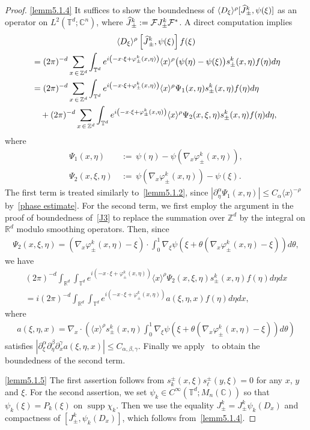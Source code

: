 \documentclass[10pt]{amsart}
\theoremstyle{definition}
\numberwithin{equation}{section}
\renewcommand{\a}{\alpha}
\renewcommand{\b}{\beta}
\newcommand{\g}{\gamma}
\newcommand{\f}{\varphi}
\newcommand{\x}{\xi}
\newcommand{\y}{\eta}
\newcommand{\C}{\mathbb{C}}
\newcommand{\R}{\mathbb{R}}
\newcommand{\Z}{\mathbb{Z}}
\newcommand{\T}{\mathbb{T}}
\newcommand{\FS}{\mathcal{F}}
\newcommand{\la}{\langle}
\newcommand{\ra}{\rangle}
\newcommand{\jap}[1]{\langle #1 \rangle}
\DeclareMathOperator{\supp}{supp}
\let\oldhat\hat
\renewcommand*{\hat}[1]{\mathchoice{\widehat{#1}}{\widehat{#1}}{\oldhat{#1}}{\oldhat{#1}}}
\begin{document}
\begin{proof}
\eqref{lemm5.1.4} It suffices to show the boundedness of $\jap{D_\x}^\rho [\hat{J}_\pm^k, \psi(\x)]$ as an operator on $L^2(\T^d;\C^n)$, where $\hat{J}_\pm^k:=\FS J_\pm^k\FS^*$. A direct computation implies
\begin{multline*}
\la D_\x \ra^\rho \left[\hat{J}_\pm^k, \psi(\x)\right]f(\x) \\
\begin{aligned}
&= (2\pi)^{-d} \sum_{x\,\in\,\Z^d}\int_{\T^d} e^{i\left(-x\cdot\x+\f_\pm^k(x,\y)\right)} \jap{x}^\rho \bigl(\psi(\y)-\psi(\x)\bigr) s_\pm^k(x,\y) f(\y) d\y \\
&= (2\pi)^{-d} \sum_{x\,\in\,\Z^d}\int_{\T^d} e^{i\left(-x\cdot\x+\f_\pm^k(x,\y)\right)} \jap{x}^\rho \Psi_1(x,\y) s_\pm^k(x,\y) f(\y) d\y  \\
&\quad + (2\pi)^{-d} \sum_{x\,\in\,\Z^d}\int_{\T^d} e^{i\left(-x\cdot\x+\f_\pm^k(x,\y)\right)} \jap{x}^\rho \Psi_2(x,\x,\y) s_\pm^k(x,\y) f(\y) d\y, 
\end{aligned}
\end{multline*}
where
\begin{align*}
\Psi_1(x,\y)\, &{:=}\,  \psi(\y)-\psi\left(\nabla_x\f_\pm^k(x,\y)\right), \\
\Psi_2(x,\x,\y)\, &{:=}\,  \psi\left(\nabla_x\f_\pm^k(x,\y)\right)-\psi(\x).
\end{align*}
The first term is treated similarly to~\eqref{lemm5.1.2}, since $|\partial_\y^\a \Psi_1(x,\y)| \leq C_\a \jap{x}^{-\rho}$ by~\eqref{phase estimate}. For the second term, we first employ the argument in the proof of boundedness of~\eqref{J3} to replace the summation over $\Z^d$ by the integral on $\R^d$ modulo smoothing operators. Then, since
\begin{align*}
\Psi_2(x,\x,\y) = \left(\nabla_x\f_\pm^k(x,\y)-\x\right)\cdot\int_0^1 \nabla_\x \psi\left(\x+\theta\left(\nabla_x\f_\pm^k(x,\y)-\x\right)\right) d\theta,
\end{align*}
we have
\begin{multline*}
(2\pi)^{-d} \int_{\R^d}\int_{\T^d} e^{i\left(-x\cdot\x+\f_\pm^k(x,\y)\right)} \jap{x}^\rho \Psi_2(x,\x,\y) s_\pm^k(x,\y) f(\eta) d\eta dx \\
= i(2\pi)^{-d} \int_{\R^d}\int_{\T^d} e^{i\left(-x\cdot\x+\f_\pm^k(x,\y)\right)} a(\x,\y,x) f(\y) d\y dx,
\end{multline*}
where
\begin{align*}
a(\x,\y,x)=\nabla_x \cdot \left(\jap{x}^\rho s_\pm^k(x,\y) \int_0^1 \nabla_\x\psi\left(\x+\theta\left(\nabla_x\f_\pm^k(x,\y)-\x\right)\right) d\theta \right)
\end{align*}
satisfies $|\partial_\x^\a\partial_\y^\b\partial_x^\g a(\x,\y,x)|\leq C_{\a,\b,\g}$. Finally we apply~\cite[Theorem~2.1]{As-F} to obtain the boundedness of the second term.

\eqref{lemm5.1.5} The first assertion follows from $s_k^\pm(x,\x)s_\ell^\pm(y,\x)=0$ for any $x$, $y$ and $\x$. For the second assertion, we set $\psi_k\in C^\infty(\T^d;M_n(\C))$ so that $\psi_k(\x)=P_k(\x)$ on $\supp \chi_k$. Then we use the equality $J_\pm^k=J_\pm^k \psi_k(D_x)$ and compactness of $[J_\pm^k,\psi_k(D_x)]$, which follows from~\eqref{lemm5.1.4}.
\end{proof}
\end{document}
